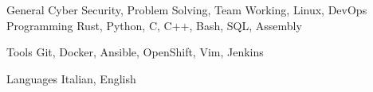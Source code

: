 

\begin{cvskills}

	\cvskill
	{General} %
	{Cyber Security, Problem Solving, Team Working, Linux, DevOps} %
	\cvskill
	{Programming} %
	{Rust, Python, C, C++, Bash, SQL, Assembly} %

	\cvskill
	{Tools} %
	{Git, Docker, Ansible, OpenShift, Vim, Jenkins} %

	\cvskill
	{Languages} %
	{Italian, English} %

\end{cvskills}

